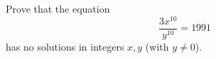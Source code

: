 Prove that the equation
\[
\dfrac{3x^{10}}{y^{10}}=1991
\]
has no solutions in integers $x,y$ (with $y\ne0$).

